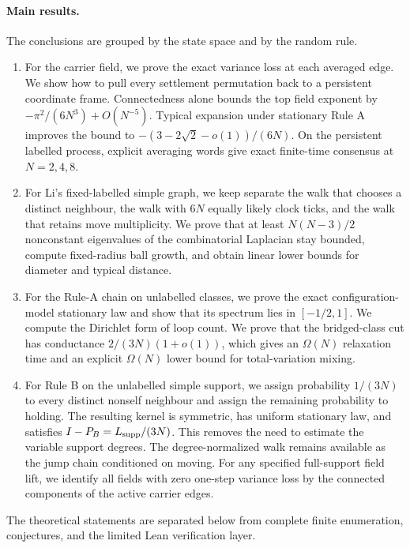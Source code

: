 \documentclass[11pt]{article}
\theoremstyle{definition}
\begin{document}
\paragraph{Main results.}
The conclusions are grouped by the state space and by the random rule.
\begin{enumerate}[leftmargin=*]
    \item For the carrier field, we prove the exact variance loss at each
    averaged edge.  We show how to pull every settlement permutation back to
    a persistent coordinate frame.  Connectedness alone bounds the top field
    exponent by $-\pi^2/(6N^3)+O(N^{-5})$.  Typical expansion under stationary
    Rule A improves the bound to $-(3-2\sqrt2-o(1))/(6N)$.  On the
    persistent labelled process, explicit averaging words give exact
    finite-time consensus at $N=2,4,8$.
    \item For Li's fixed-labelled simple graph, we keep separate the walk that
    chooses a distinct neighbour, the walk with $6N$ equally likely clock ticks, and
    the walk that retains move multiplicity.  We prove that at least
    $N(N-3)/2$ nonconstant eigenvalues of the combinatorial Laplacian stay
    bounded, compute fixed-radius ball growth, and obtain linear lower bounds
    for diameter and typical distance.
    \item For the Rule-A chain on unlabelled classes, we prove the exact
    configuration-model stationary law and show that its spectrum lies in
    $[-1/2,1]$.  We compute the Dirichlet form of loop count.  We prove that the
    bridged-class cut has conductance $2/(3N)(1+o(1))$, which gives an
    $\Omega(N)$ relaxation time and an explicit $\Omega(N)$ lower bound for
    total-variation mixing.
    \item For Rule B on the unlabelled simple support, we assign probability
    $1/(3N)$ to every distinct nonself neighbour and assign the remaining
    probability to holding.  The resulting kernel is symmetric, has uniform
    stationary law, and satisfies $I-P_B=L_{\rm supp}/(3N)$.  This removes the
    need to estimate the variable support degrees.  The degree-normalized walk
    remains available as the jump chain conditioned on moving.  For any
    specified full-support field lift, we identify all fields with zero
    one-step variance loss by the connected components of the active carrier
    edges.
\end{enumerate}
The theoretical statements are separated below from complete finite
enumeration, conjectures, and the limited Lean verification layer.
\end{document}
